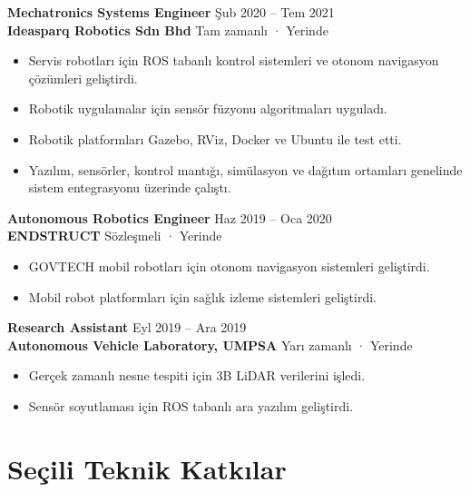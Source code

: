 \documentclass[11pt,a4paper]{article}
\begin{document}
\textbf{Mechatronics Systems Engineer} \hfill Şub 2020 -- Tem 2021\\
\textbf{Ideasparq Robotics Sdn Bhd} \hfill Tam zamanlı · Yerinde

\begin{itemize}
    \item Servis robotları için ROS tabanlı kontrol sistemleri ve otonom navigasyon çözümleri geliştirdi.
    \item Robotik uygulamalar için sensör füzyonu algoritmaları uyguladı.
    \item Robotik platformları Gazebo, RViz, Docker ve Ubuntu ile test etti.
    \item Yazılım, sensörler, kontrol mantığı, simülasyon ve dağıtım ortamları genelinde sistem entegrasyonu üzerinde çalıştı.
\end{itemize}

\textbf{Autonomous Robotics Engineer} \hfill Haz 2019 -- Oca 2020\\
\textbf{ENDSTRUCT} \hfill Sözleşmeli · Yerinde

\begin{itemize}
    \item GOVTECH mobil robotları için otonom navigasyon sistemleri geliştirdi.
    \item Mobil robot platformları için sağlık izleme sistemleri geliştirdi.
\end{itemize}

\textbf{Research Assistant} \hfill Eyl 2019 -- Ara 2019\\
\textbf{Autonomous Vehicle Laboratory, UMPSA} \hfill Yarı zamanlı · Yerinde

\begin{itemize}
    \item Gerçek zamanlı nesne tespiti için 3B LiDAR verilerini işledi.
    \item Sensör soyutlaması için ROS tabanlı ara yazılım geliştirdi.
\end{itemize}

\section*{Seçili Teknik Katkılar}
\end{document}
